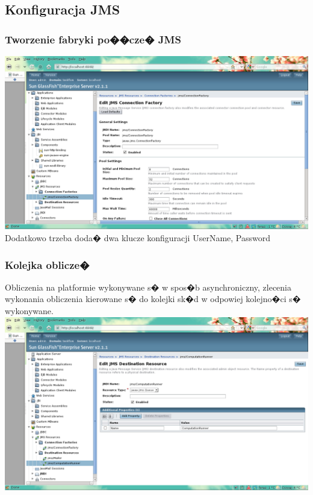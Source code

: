\documentclass{article}
\begin{document}
\subsection{Konfiguracja JMS}
\subsubsection{Tworzenie fabryki po��cze� JMS}
\newline
\newline
\includegraphics[scale=0.4]{img/admin05.png}
\newline
\newline
Dodatkowo trzeba doda� dwa klucze konfiguracji UserName, Password
\subsubsection{Kolejka oblicze�}
Obliczenia na platformie wykonywane s� w spos�b asynchroniczny, zlecenia wykonania obliczenia kierowane s� do kolejki sk�d
w odpowiej kolejno�ci s� wykonywane.
\newline
\newline
\includegraphics[scale=0.4]{img/admin04.png}
\newline
\newline
\end{document}
